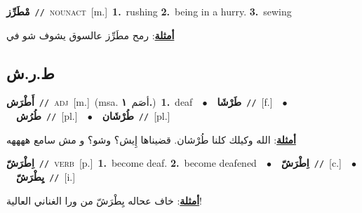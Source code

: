 \documentclass[10pt,a4paper,twoside]{article} %
\begin{document}
\begin{multicols}{2}
{\setlength\topsep{0pt}\textbf{\foreignlanguage{arabic}{مْطَرِّز}}\ {\color{gray}\texttt{//}\color{black}}\ \textsc{noun\textunderscore act}\ [m.]\ \textbf{1.}~rushing  \textbf{2.}~being in a hurry.  \textbf{3.}~sewing\  \begin{flushright}\color{gray}\foreignlanguage{arabic}{\textbf{\underline{\foreignlanguage{arabic}{أمثلة}}}: رمح مطَرِّز عالسوق يشوف شو في}\end{flushright}\color{black}} \vspace{2mm}

\vspace{-3mm}
\subsection*{\color{blue}\foreignlanguage{arabic}{ط.ر.ش}\color{blue}{}} 

{\setlength\topsep{0pt}\textbf{\foreignlanguage{arabic}{أَطْرَش}}\ {\color{gray}\texttt{//}\color{black}}\ \textsc{adj}\ [m.]\ \color{gray}(msa. \foreignlanguage{arabic}{أصَم}~\foreignlanguage{arabic}{\textbf{١.}})\color{black}\ \textbf{1.}~deaf\ \ $\bullet$\ \ \setlength\topsep{0pt}\textbf{\foreignlanguage{arabic}{طَرْشَا}}\ {\color{gray}\texttt{//}\color{black}}\ [f.]\ \ $\bullet$\ \ \setlength\topsep{0pt}\textbf{\foreignlanguage{arabic}{طُرُش}}\ {\color{gray}\texttt{//}\color{black}}\ [pl.]\ \ $\bullet$\ \ \setlength\topsep{0pt}\textbf{\foreignlanguage{arabic}{طُرْشَان}}\ {\color{gray}\texttt{//}\color{black}}\ [pl.]\  \begin{flushright}\color{gray}\foreignlanguage{arabic}{\textbf{\underline{\foreignlanguage{arabic}{أمثلة}}}: الله وكيلك كلنا طُرْشان. قضيناها إِيش؟ وشو؟ و مش سامع ههههه}\end{flushright}\color{black}} \vspace{2mm}

{\setlength\topsep{0pt}\textbf{\foreignlanguage{arabic}{اِطْرَشّ}}\ {\color{gray}\texttt{//}\color{black}}\ \textsc{verb}\ [p.]\ \textbf{1.}~become deaf.  \textbf{2.}~become deafened\ \ $\bullet$\ \ \setlength\topsep{0pt}\textbf{\foreignlanguage{arabic}{اِطْرَشّ}}\ {\color{gray}\texttt{//}\color{black}}\ [c.]\ \ $\bullet$\ \ \setlength\topsep{0pt}\textbf{\foreignlanguage{arabic}{يِطْرَشّ}}\ {\color{gray}\texttt{//}\color{black}}\ [i.]\  \begin{flushright}\color{gray}\foreignlanguage{arabic}{\textbf{\underline{\foreignlanguage{arabic}{أمثلة}}}: خاف عحاله يِطْرَشّ من ورا الغناني العالية!}\end{flushright}\color{black}} \vspace{2mm}


\end{multicols}
\end{document}
